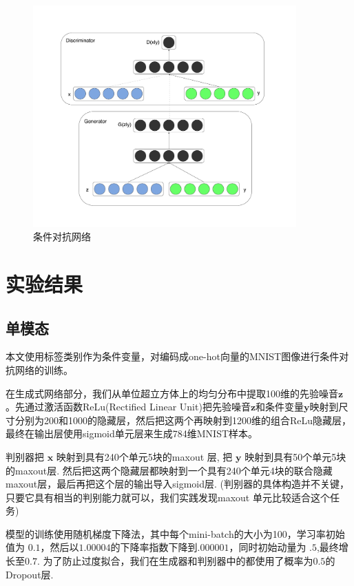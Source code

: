 \documentclass{article} %
\begin{document}
\begin{figure}[h]
\centering
    \includegraphics[width=0.9\textwidth]{diagram.pdf}
    \caption{\small 条件对抗网络}
\label{fig:diagram}
\end{figure}


\section{实验结果}
\subsection{单模态}

本文使用标签类别作为条件变量，对编码成one-hot向量的MNIST图像进行条件对抗网络的训练。

在生成式网络部分，我们从单位超立方体上的均匀分布中提取100维的先验噪音${\bm{z}}$。先通过激活函数ReLu(Rectified Linear Unit)\cite{glorot2011deep, Jarrett-ICCV2009-small}把先验噪音${\bm{z}}$和条件变量${\bm{y}}$映射到尺寸分别为200和1000的隐藏层，然后把这两个再映射到1200维的组合ReLu隐藏层，最终在输出层使用sigmoid单元层来生成784维MNIST样本。

判别器把 ${\bm{x}}$ 映射到具有240个单元5块的maxout \cite{Goodfellow_maxout_2013} 层, 把 ${\bm{y}}$ 映射到具有50个单元5块的maxout层. 然后把这两个隐藏层都映射到一个具有240个单元4块的联合隐藏maxout层，最后再把这个层的输出导入sigmoid层. (判别器的具体构造并不关键，只要它具有相当的判别能力就可以，我们实践发现maxout 单元比较适合这个任务)

模型的训练使用随机梯度下降法，其中每个mini-batch的大小为100，学习率初始值为 $0.1$，然后以$1.00004$的下降率指数下降到$.000001$，同时初始动量为 $.5$,最终增长至$0.7$. 为了防止过度拟合，我们在生成器和判别器中的都使用了概率为$0.5$的Dropout层\cite{Hinton-et-al-arxiv2012}.
\end{document}
